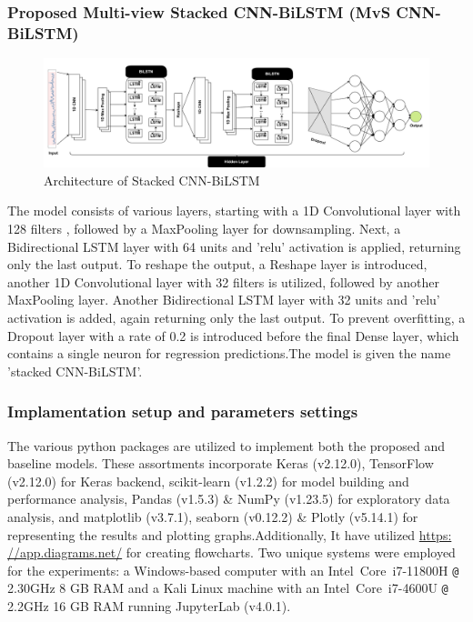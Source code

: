 \documentclass[a4paper, fleqn]{cas-sc}
\theoremstyle{definition}
\theoremstyle{remark}
\begin{document}
\subsubsection{Proposed Multi-view Stacked CNN-BiLSTM (MvS CNN-BiLSTM)}
\begin{figure}[h!]
	\centering
		\includegraphics[scale=0.45]{Prpose}
	  \caption{Architecture of Stacked CNN-BiLSTM}\label{prosed_cnn-bilstm}
\end{figure}

The model consists of various layers,  starting with a 1D Convolutional layer with 128 filters ,  followed by a MaxPooling layer for downsampling. Next,  a Bidirectional LSTM layer with 64 units and 'relu' activation is applied,  returning only the last output. To reshape the output,  a Reshape layer is introduced,  another 1D Convolutional layer with 32 filters is utilized,  followed by another MaxPooling layer. Another Bidirectional LSTM layer with 32 units and 'relu' activation is added,  again returning only the last output. To prevent overfitting,  a Dropout layer with a rate of 0.2 is introduced before the final Dense layer,  which contains a single neuron for regression predictions.The model is given the name 'stacked CNN-BiLSTM'.

\subsubsection{Implamentation setup and parameters settings}
The various python packages are utilized to implement both the proposed and baseline models. These assortments incorporate Keras (v2.12.0),  TensorFlow (v2.12.0) for Keras backend,  scikit-learn (v1.2.2) for model building and performance analysis,  Pandas (v1.5.3) \& NumPy (v1.23.5) for exploratory data analysis,  and matplotlib (v3.7.1),  seaborn (v0.12.2) \& Plotly (v5.14.1) for representing the results and plotting graphs.Additionally,  It have utilized \href{https: //app.diagrams.net/}{https: //app.diagrams.net/} for creating flowcharts. Two unique systems were employed for the experiments:  a Windows-based computer with an Intel\textregistered ~Core\texttrademark ~i7-11800H \texttt{@} 2.30GHz 8 GB RAM and a Kali Linux machine with an Intel\textregistered ~Core\texttrademark ~i7-4600U \texttt{@} 2.2GHz 16 GB RAM running JupyterLab (v4.0.1).
\end{document}
